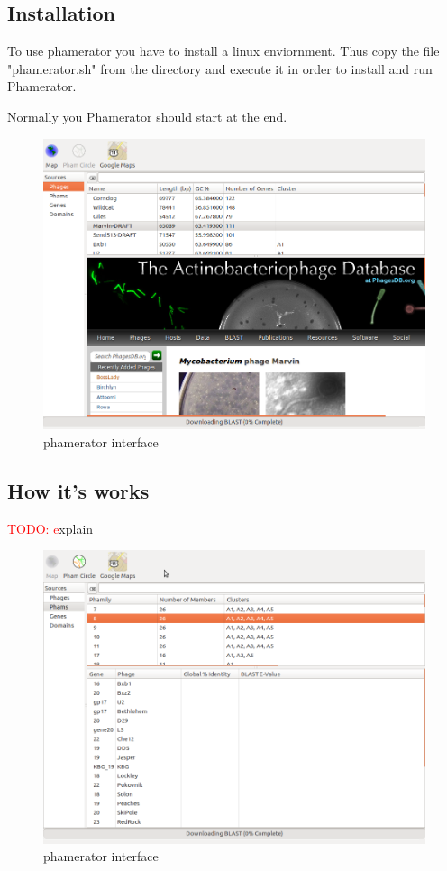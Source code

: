 \documentclass[a4paper,11pt]{report}
\newcommand{\todo}[1]{\textcolor{red}{TODO: #1}\PackageWarning{TODO:}{#1!}}
\begin{document}
\subsection{Installation}
To use phamerator you have to install a linux enviornment. Thus copy the file "phamerator.sh" from the directory and execute it in order to install and run Phamerator.

Normally you Phamerator should start at the end.

\begin{figure}[H] 
	\begin{center}
		\includegraphics[scale=0.45]{img/phamerator_1}
		\caption{phamerator interface}
	\end{center}
\end{figure}

\subsection{How it's works}
\todo explain
\begin{figure}[H] 
	\begin{center}
		\includegraphics[scale=0.45]{img/phamerator_2}
		\caption{phamerator interface}
	\end{center}
\end{figure}
\end{document}
